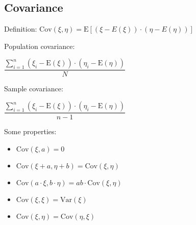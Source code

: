 \documentclass[10pt, a4paper, landscape]{extarticle}
\newcommand{\E}{\mathrm{E}}
\newcommand{\Var}{\mathrm{Var}}
\newcommand{\Cov}{\mathrm{Cov}}
\begin{document}
\begin{multicols}{3}
	\subsection*{Covariance}
	Definition: \quad $\Cov(\xi, \eta) = \E[(\xi - E(\xi)) \cdot (\eta - E(\eta))]$
	\begin{multicols}{2}
		Population covariance:
		\begin{center}
			$\dfrac{\sum_{i=1}^{n} (\xi_i - \E(\xi)) \cdot (\eta_i - \E(\eta))}{N}$
		\end{center}
		\columnbreak
		Sample covariance:
		\begin{center}
			$\dfrac{\sum_{i=1}^{n} (\xi_i - \E(\xi)) \cdot (\eta_i - \E(\eta))}{n-1}$
		\end{center}
	\end{multicols}
	Some properties:
	\begin{itemize}[leftmargin=*]
		\item $\Cov(\xi, a) = 0$
		\item $\Cov(\xi + a, \eta + b) = \Cov(\xi, \eta)$
		\item $\Cov(a \cdot \xi, b \cdot \eta) = a b \cdot \Cov(\xi, \eta)$
		\item $\Cov(\xi, \xi) = \Var(\xi)$
		\item $\Cov(\xi, \eta) = \Cov(\eta, \xi)$
	\end{itemize}
\end{multicols}
\pagebreak
\end{document}
